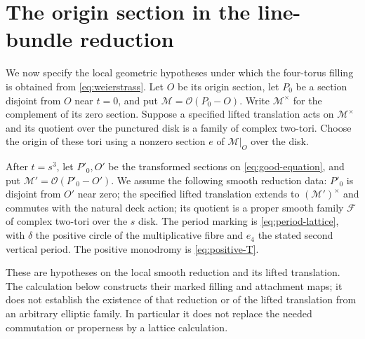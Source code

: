 \section{The origin section in the line-bundle reduction}

We now specify the local geometric hypotheses under which the
four-torus filling is obtained from \eqref{eq:weierstrass}.
Let $O$ be its origin section, let $P_0$ be a section disjoint
from $O$ near $t=0$, and put $\mathcal M=\mathcal O(P_0-O)$.
Write $\mathcal M^\times$ for the complement of its zero section.
Suppose a specified lifted translation acts on $\mathcal M^\times$
and its quotient over the punctured disk is a family of complex
two-tori. Choose the origin of these tori using a nonzero section
$e$ of $\mathcal M|_O$ over the disk.

After $t=s^3$, let $P'_0,O'$ be the transformed sections on
\eqref{eq:good-equation}, and put
$\mathcal M'=\mathcal O(P'_0-O')$. We assume the following smooth
reduction data: $P'_0$ is disjoint from $O'$ near zero; the specified
lifted translation extends to $(\mathcal M')^\times$ and commutes
with the natural deck action; its quotient is a proper smooth
family $\mathcal F$ of complex two-tori over the $s$ disk. The
period marking is \eqref{eq:period-lattice}, with $\delta$ the
positive circle of the multiplicative fibre and $e_4$ the stated
second vertical period. The positive monodromy is
\eqref{eq:positive-T}.

These are hypotheses on the local smooth reduction and its lifted
translation. The calculation below constructs their marked filling
and attachment maps; it does not establish the existence of that
reduction or of the lifted translation from an arbitrary elliptic
family. In particular it does not replace the needed commutation
or properness by a lattice calculation.


